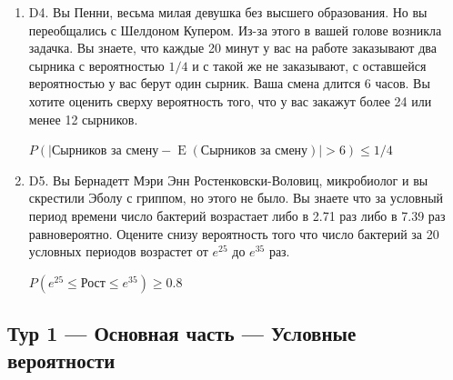 \documentclass[12pt]{article}
\DeclareMathOperator{\E}{E}
\def \P{P}
\newenvironment{problem}{}{}
\newenvironment{sol}{}{} %
\begin{document}
\begin{enumerate}
\begin{problem}
\item[D4.] Вы Пенни, весьма милая девушка без высшего образования. Но вы переобщались с Шелдоном Купером. Из-за этого в вашей голове возникла задачка. Вы знаете, что каждые 20 минут у вас на работе заказывают два сырника с вероятностью $1/4$ и с такой же не заказывают, с оставшейся вероятностью у вас берут один сырник. Ваша смена длится 6 часов. Вы хотите оценить сверху вероятность того, что у вас закажут более 24 или менее 12 сырников. 

\begin{sol}
$\P(\vert \text{Сырников за смену} - \E(\text{Сырников за смену}) \vert  >6) \leq 1/4$
\end{sol}
\end{problem}

\begin{problem}
\item[D5.] Вы Бернадетт Мэри Энн Ростенковски-Воловиц, микробиолог и вы скрестили Эболу с гриппом, но этого не было. Вы знаете что за условный период времени число бактерий возрастает либо в 2.71 раз либо в 7.39 раз равновероятно. Оцените снизу вероятность того что число бактерий за 20 условных периодов возрастет от $e^{25}$ до $e^{35}$ раз.

\begin{sol}
$\P(e^{25} \leq \text{Рост} \leq e^{35}) \geq 0.8 $ 
\end{sol}
\end{problem}


\end{enumerate}

\newpage
\subsection{Тур 1 — Основная часть — Условные вероятности}
\end{document}
